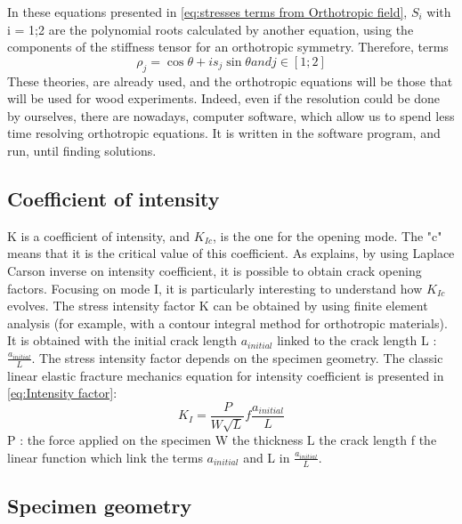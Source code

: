 In these equations presented in \ref{eq:stresses terms from Orthotropic field}, $S_{i}$ with i = {1;2} are the polynomial roots calculated by another equation, using the components of the stiffness tensor for an orthotropic symmetry. 
Therefore, terms
\begin{equation}	
	\rho_{j}=\cos{\theta}+i s_{j} \sin{\theta} and j\in{[1;2]}
	\label{eq:terms present in stress equations}
\end{equation}			
These theories, are already used, and the orthotropic equations will be those that will be used for wood experiments. Indeed, even if the resolution could be done by ourselves, there are nowadays, computer software, which allow us to spend less time resolving orthotropic equations. It is written in the software program, and run, until finding solutions.

\subsection{Coefficient of intensity}

K is a coefficient of intensity, and $K_{Ic}$, is the one for the opening mode. The "c" means that it is the critical value of this coefficient. As \parencite{Reference10} explains, by using Laplace Carson inverse on intensity coefficient, it is possible to obtain crack opening factors. Focusing on mode I, it is particularly interesting to understand how $K_{Ic}$ evolves. The stress intensity factor K can be obtained by using finite element analysis (for example, with a contour integral method for orthotropic materials). It is obtained with the initial crack length $a_{initial}$ linked to the crack length L : $\frac{a_{initial}}{L}$.
The stress intensity factor depends on the specimen geometry. The classic linear elastic fracture mechanics equation for intensity coefficient is presented in \ref{eq:Intensity factor}:
\begin{equation}
	K_{I}=\frac{P}{W\sqrt{L}}f\frac{a_{initial}}{L} 	
	\label{eq:Intensity factor}
\end{equation} 						
P : the force applied on the specimen 
W the thickness
L the crack length 
f the linear function which link the terms $a_{initial}$ and L in $\frac{a_{initial}}{L}$. 



\subsection{Specimen geometry}

